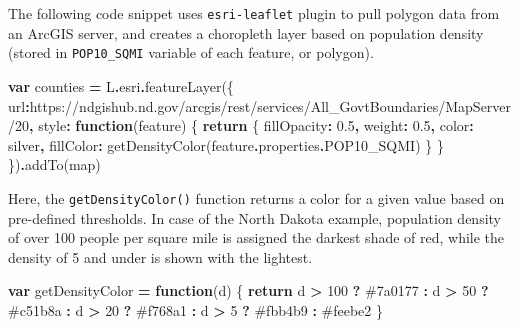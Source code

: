\documentclass[
  english,
]{book}
\newenvironment{Shaded}{\begin{snugshade}}{\end{snugshade}}
\newcommand{\AttributeTok}[1]{\textcolor[rgb]{0.77,0.63,0.00}{#1}}
\newcommand{\ControlFlowTok}[1]{\textcolor[rgb]{0.13,0.29,0.53}{\textbf{#1}}}
\newcommand{\DataTypeTok}[1]{\textcolor[rgb]{0.13,0.29,0.53}{#1}}
\newcommand{\DecValTok}[1]{\textcolor[rgb]{0.00,0.00,0.81}{#1}}
\newcommand{\FloatTok}[1]{\textcolor[rgb]{0.00,0.00,0.81}{#1}}
\newcommand{\FunctionTok}[1]{\textcolor[rgb]{0.00,0.00,0.00}{#1}}
\newcommand{\KeywordTok}[1]{\textcolor[rgb]{0.13,0.29,0.53}{\textbf{#1}}}
\newcommand{\NormalTok}[1]{#1}
\newcommand{\OperatorTok}[1]{\textcolor[rgb]{0.81,0.36,0.00}{\textbf{#1}}}
\newcommand{\StringTok}[1]{\textcolor[rgb]{0.31,0.60,0.02}{#1}}
\begin{document}
The following code snippet uses \texttt{esri-leaflet} plugin to pull polygon data
from an ArcGIS server, and creates a choropleth layer based on population density
(stored in \texttt{POP10\_SQMI} variable of each feature, or polygon).

\begin{Shaded}
\begin{Highlighting}[]
\KeywordTok{var}\NormalTok{ counties }\OperatorTok{=}\NormalTok{ L}\OperatorTok{.}\AttributeTok{esri}\OperatorTok{.}\FunctionTok{featureLayer}\NormalTok{(\{}
  \DataTypeTok{url}\OperatorTok{:}\StringTok{\textquotesingle{}https://ndgishub.nd.gov/arcgis/rest/services/All\_GovtBoundaries/MapServer/20\textquotesingle{}}\OperatorTok{,}
  \DataTypeTok{style}\OperatorTok{:} \KeywordTok{function}\NormalTok{(feature) \{}
    \ControlFlowTok{return}\NormalTok{ \{}
      \DataTypeTok{fillOpacity}\OperatorTok{:} \FloatTok{0.5}\OperatorTok{,}
      \DataTypeTok{weight}\OperatorTok{:} \FloatTok{0.5}\OperatorTok{,}
      \DataTypeTok{color}\OperatorTok{:} \StringTok{\textquotesingle{}silver\textquotesingle{}}\OperatorTok{,}
      \DataTypeTok{fillColor}\OperatorTok{:} \FunctionTok{getDensityColor}\NormalTok{(feature}\OperatorTok{.}\AttributeTok{properties}\OperatorTok{.}\AttributeTok{POP10\_SQMI}\NormalTok{)}
\NormalTok{    \}}
\NormalTok{  \}}
\NormalTok{\})}\OperatorTok{.}\FunctionTok{addTo}\NormalTok{(map)}
\end{Highlighting}
\end{Shaded}

Here, the \texttt{getDensityColor()} function returns a color for a given value
based on pre-defined thresholds. In case of the North Dakota example,
population density of over 100 people per square mile is assigned the darkest shade of red,
while the density of 5 and under is shown with the lightest.

\begin{Shaded}
\begin{Highlighting}[]
\KeywordTok{var}\NormalTok{ getDensityColor }\OperatorTok{=} \KeywordTok{function}\NormalTok{(d) \{}
  \ControlFlowTok{return}\NormalTok{ d }\OperatorTok{\textgreater{}} \DecValTok{100}  \OperatorTok{?} \StringTok{\textquotesingle{}\#7a0177\textquotesingle{}} \OperatorTok{:}
\NormalTok{          d }\OperatorTok{\textgreater{}} \DecValTok{50}  \OperatorTok{?} \StringTok{\textquotesingle{}\#c51b8a\textquotesingle{}} \OperatorTok{:}
\NormalTok{          d }\OperatorTok{\textgreater{}} \DecValTok{20}  \OperatorTok{?} \StringTok{\textquotesingle{}\#f768a1\textquotesingle{}} \OperatorTok{:}
\NormalTok{          d }\OperatorTok{\textgreater{}} \DecValTok{5}   \OperatorTok{?} \StringTok{\textquotesingle{}\#fbb4b9\textquotesingle{}} \OperatorTok{:}
                    \StringTok{\textquotesingle{}\#feebe2\textquotesingle{}}
\NormalTok{\}}
\end{Highlighting}
\end{Shaded}
\end{document}
